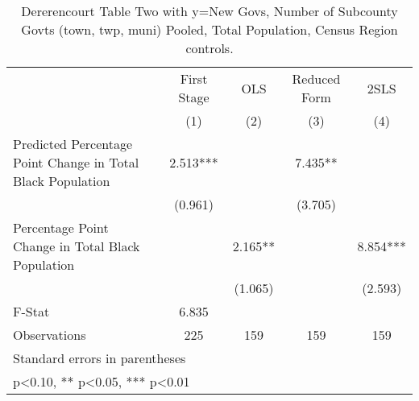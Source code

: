\begin{table}[htbp]\centering
\def\sym#1{\ifmmode^{#1}\else\(^{#1}\)\fi}
\caption{Dererencourt Table Two with y=New Govs, Number of Subcounty Govts (town, twp, muni)  Pooled, Total Population, Census Region controls.}
\begin{tabular}{l*{4}{c}}
\toprule
                    & First Stage   &         OLS   &Reduced Form   &        2SLS   \\
                    &\multicolumn{1}{c}{(1)}   &\multicolumn{1}{c}{(2)}   &\multicolumn{1}{c}{(3)}   &\multicolumn{1}{c}{(4)}   \\
\midrule
Predicted Percentage Point Change in Total Black Population&       2.513***&               &       7.435** &               \\
                    &     (0.961)   &               &     (3.705)   &               \\
\addlinespace
Percentage Point Change in Total Black Population&               &       2.165** &               &       8.854***\\
                    &               &     (1.065)   &               &     (2.593)   \\
\midrule
F-Stat              &       6.835   &               &               &               \\
Observations        &         225   &         159   &         159   &         159   \\
\bottomrule
\multicolumn{5}{l}{\footnotesize Standard errors in parentheses}\\
\multicolumn{5}{l}{\footnotesize * p<0.10, ** p<0.05, *** p<0.01}\\
\end{tabular}
\end{table}
